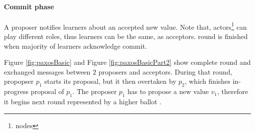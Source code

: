 \paragraph{Commit phase}
A proposer notifies learners about an accepted new value. Note that, actors\footnote{nodes} can play different roles, thus learners can be the same, as acceptors. \paxos round is finished when majority of learners acknowledge commit.



Figure \ref{fig:paxosBasic} and Figure \ref{fig:paxosBasicPart2} show complete \paxos round and exchanged messages between $2$ proposers and acceptors.
During that round, propopser $p_1$ starts its proposal, but it then overtaken by $p_2$, which finishes in-progress proposal of $p_1$.
 The proposer $p_1$ has to propose a new value $v_1$, therefore it begins next \paxos round represented by a higher ballot \ballot.

